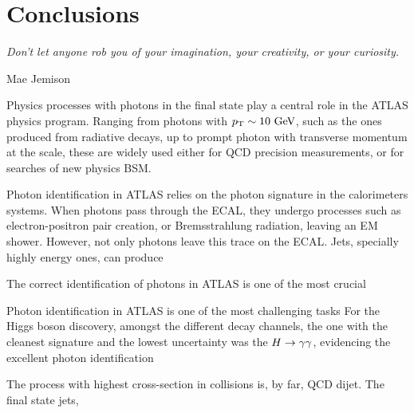 \chapter*{Conclusions}
\epigraph{\emph{Don't let anyone rob you of your imagination, your creativity, or your curiosity.}} {Mae Jemison}





Physics processes with photons in the final state play a central role in the \ac{ATLAS} physics program. Ranging from photons with \(p_{\text{T}} \sim 10~\text{GeV}\), such as the ones produced from radiative \Zboson decays, up to prompt photon with transverse momentum at the \tev scale, these are widely used either for \ac{QCD} precision measurements, or for searches of new physics \ac{BSM}.


Photon identification in \ac{ATLAS} relies on the photon signature in the calorimeters systems. When photons pass through the \ac{ECAL}, they undergo processes such as electron-positron pair creation, or Bremsstrahlung radiation, leaving an \ac{EM} shower. However, not only photons leave this trace on the \ac{ECAL}. Jets, specially highly energy ones, can produce 


The correct identification of photons in \ac{ATLAS} is one of the most crucial 

Photon identification in \ac{ATLAS} is one of the most challenging tasks 
For the Higgs boson discovery, amongst the different decay channels, the one with the cleanest signature and the lowest uncertainty was the \(H \rightarrow \gamma\gamma\), evidencing the excellent photon identification 


The process with highest cross-section in \pp collisions is, by far, \ac{QCD} dijet. The final state jets, 













